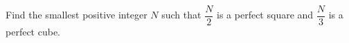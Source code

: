 Find the smallest positive integer $N$ such that $\dfrac{N}{2}$ is a perfect square and $\dfrac{N}{3}$ is a perfect cube.
